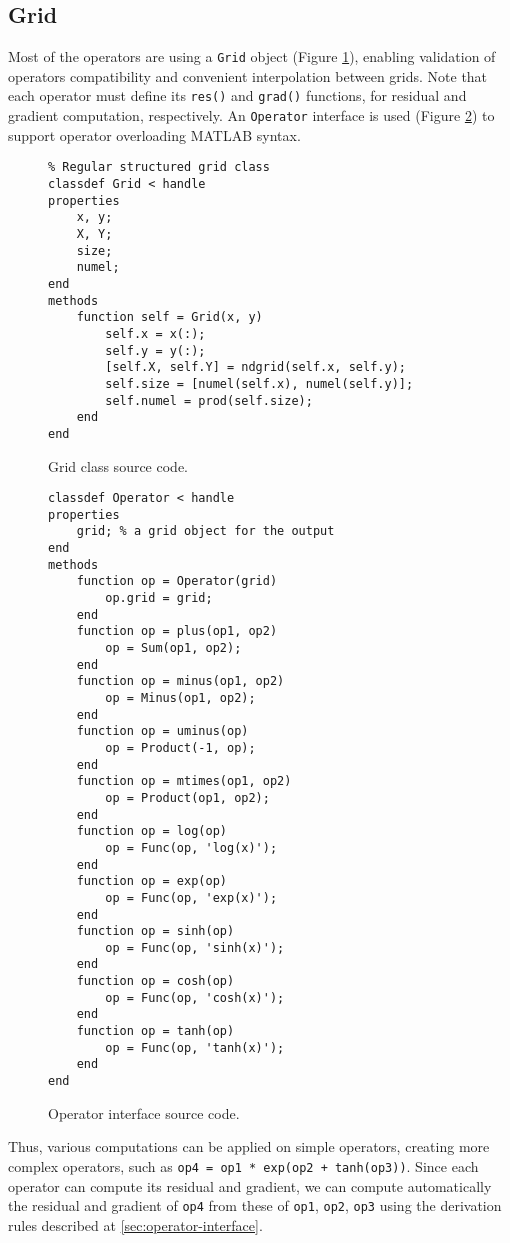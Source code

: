\documentclass[MSc,beforeExam]{iitcsthesis}
\begin{document}
\subsection{Grid}
Most of the operators are using a \verb|Grid| object (Figure \ref{fig:grid.m}),
enabling validation of operators compatibility and 
convenient interpolation between grids. Note that
each operator must define its \verb|res()| and \verb|grad()|
functions, for residual and gradient computation, respectively.
An \verb|Operator| interface is used (Figure \ref{fig:operator.m}) 
to support operator overloading MATLAB syntax.
\begin{figure}[h]
\begin{verbatim}
% Regular structured grid class
classdef Grid < handle
properties
    x, y;
    X, Y;
    size;    
    numel;
end
methods
    function self = Grid(x, y)
        self.x = x(:);
        self.y = y(:);
        [self.X, self.Y] = ndgrid(self.x, self.y);
        self.size = [numel(self.x), numel(self.y)];
        self.numel = prod(self.size);
    end
end
\end{verbatim}
\caption{Grid class source code.} \label{fig:grid.m}
\end{figure}
\begin{figure}[h]
\begin{verbatim}
classdef Operator < handle
properties
    grid; % a grid object for the output
end
methods
    function op = Operator(grid)
        op.grid = grid;
    end
    function op = plus(op1, op2)
        op = Sum(op1, op2);
    end
    function op = minus(op1, op2)
        op = Minus(op1, op2);
    end
    function op = uminus(op)
        op = Product(-1, op);
    end
    function op = mtimes(op1, op2)
        op = Product(op1, op2);
    end
    function op = log(op)
        op = Func(op, 'log(x)');
    end
    function op = exp(op)
        op = Func(op, 'exp(x)');
    end
    function op = sinh(op)
        op = Func(op, 'sinh(x)');
    end
    function op = cosh(op)
        op = Func(op, 'cosh(x)');
    end
    function op = tanh(op)
        op = Func(op, 'tanh(x)');
    end
end
\end{verbatim}
\caption{Operator interface source code.} \label{fig:operator.m}
\end{figure}

Thus, various computations can be applied on simple operators, 
creating more complex operators, such as
\verb|op4 = op1 * exp(op2 + tanh(op3))|. 
Since each operator can compute its residual and gradient, we
can compute automatically the residual and gradient of \verb|op4|
from these of \verb|op1|, \verb|op2|, \verb|op3| using the derivation
rules described at \ref{sec:operator-interface}.
\end{document}
